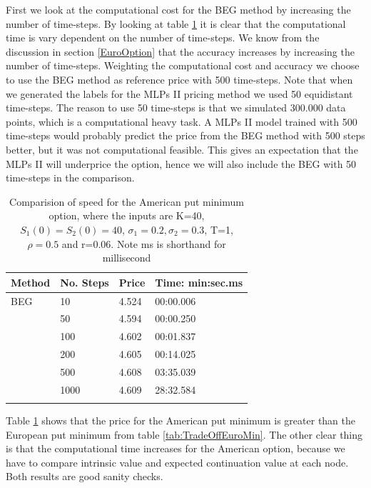 First we look at the computational cost for the BEG method by increasing the number of time-steps. By looking at table \ref{tab:TradeOffAmerMin} it is clear that the computational time is vary dependent on the number of time-steps. We know from the discussion in section \ref{EuroOption} that the accuracy increases by increasing the number of time-steps. Weighting the computational cost and accuracy we choose to use the BEG method as reference price with 500 time-steps. Note that when we generated the labels for the MLPs II pricing method we used 50 equidistant time-steps. The reason to use 50 time-steps is that we simulated 300.000 data points, which is a computational heavy task. A MLPs II model trained with 500 time-steps would probably predict the price from the BEG method with 500 steps better, but it was not computational feasible. This gives an expectation that the MLPs II will underprice the option, hence we will also include the BEG with 50 time-steps in the comparison.\\

\begin{table}[th]
\caption{Comparision of speed for the American put minimum option, where the inputs are K=40, $S_1(0)=S_2(0)=40$, $\sigma_1=0.2, \sigma_2=0.3$, T=1, $\rho=0.5$  and r=0.06. Note ms is shorthand for millisecond}
\label{tab:TradeOffAmerMin}
\centering
\begin{tabular}{l l l l}
\toprule
\textbf{Method} & \textbf{No. Steps} & \textbf{Price} & \textbf{Time: min:sec.ms} \\
\midrule
BEG & 10 & 4.524 & 00:00.006\\
& 50 & 4.594 & 00:00.250\\
& 100 & 4.602 & 00:01.837\\
& 200 & 4.605 & 00:14.025\\
& 500 & 4.608 & 03:35.039\\
& 1000 & 4.609 & 28:32.584\\
\bottomrule\\
\end{tabular}
\end{table}

Table \ref{tab:TradeOffAmerMin} shows that the price for the American put minimum is greater than the European put minimum from table \ref{tab:TradeOffEuroMin}. The other clear thing is that the computational time increases for the American option, because we have to compare intrinsic value and expected continuation value at each node. Both results are good sanity checks.\\

